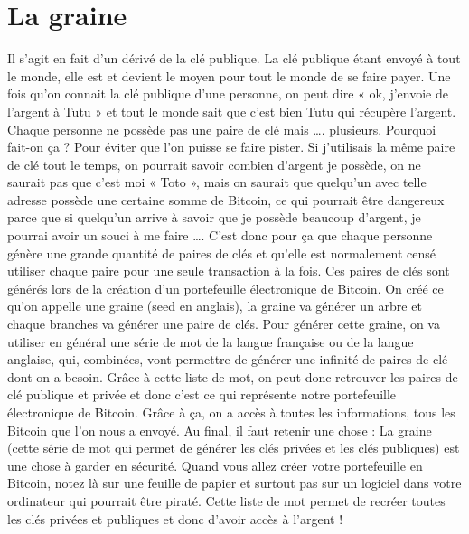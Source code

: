 \documentclass{bredele} %
\begin{document}
    \section*{La graine}
    Il s’agit en fait d’un dérivé de la clé publique. La clé publique étant envoyé à tout le monde, elle est et devient le moyen pour tout le monde de se faire payer. Une fois qu’on connait la clé publique d’une personne, on peut dire « ok, j’envoie de l’argent à Tutu » et tout le monde sait que c’est bien Tutu qui récupère l’argent.
    \newline
    \newline
    Chaque personne ne possède pas une paire de clé mais …. plusieurs. Pourquoi fait-on ça ? Pour éviter que l’on puisse se faire pister. Si j’utilisais la même paire de clé tout le temps, on pourrait savoir combien d’argent je possède, on ne saurait pas que c’est moi « Toto », mais on saurait que quelqu’un avec telle adresse possède une certaine somme de Bitcoin, ce qui pourrait être dangereux parce que si quelqu’un arrive à savoir que je possède beaucoup d’argent, je pourrai avoir un souci à me faire ….
    \newline
    \newline
    C’est donc pour ça que chaque personne génère une grande quantité de paires de clés et qu’elle est normalement censé utiliser chaque paire pour une seule transaction à la fois.
    \newline
    Ces paires de clés sont générés lors de la création d’un portefeuille électronique de Bitcoin.
    \newline
    On créé ce qu’on appelle une graine (seed en anglais), la graine va générer un arbre et chaque branches va générer une paire de clés. Pour générer cette graine, on va utiliser en général une série de mot de la langue française ou de la langue anglaise, qui, combinées, vont permettre de générer une infinité de paires de clé dont on a besoin. Grâce à cette liste de mot, on peut donc retrouver les paires de clé publique et privée et donc c’est ce qui représente notre portefeuille électronique de Bitcoin. Grâce à ça, on a accès à toutes les informations, tous les Bitcoin que l’on nous a envoyé.
    \newline
    \newline
    Au final, il faut retenir une chose :  La graine (cette série de mot qui permet de générer les clés privées et les clés publiques) est une chose à garder en sécurité. Quand vous allez créer votre portefeuille en Bitcoin, notez là sur une feuille de papier et surtout pas sur un logiciel dans votre ordinateur qui pourrait être piraté.  Cette liste de mot permet de recréer toutes les clés privées et publiques et donc d’avoir accès à l’argent !
\end{document}
